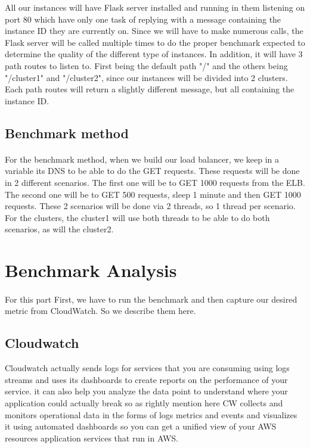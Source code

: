 \documentclass[12pt]{article}
\begin{document}
		All our instances will have Flask server installed and running in them listening on port 80 which have only one task of replying
		with a message containing the instance ID they are currently on. Since we will have to make numerous calls, the Flask server 
		will be called multiple times to do the proper benchmark expected to determine the quality of the different type of instances. In addition, it will have 3 path routes to listen to. First being the default path "/" and the others being "/cluster1" and "/cluster2", since our instances will be divided into 2 clusters. Each path routes will return a slightly different message, but all containing the instance ID.
		\bigskip

	\subsection{Benchmark method}
		\paragraph{} For the benchmark method, when we build our load balancer, we keep in a variable its DNS to be able to do the GET requests.
		These requests will be done in 2 different scenarios. The first one will be to GET 1000 requests from the ELB. The second one will be to 
		GET 500 requests, sleep 1 minute and then GET 1000 requests. These 2 scenarios will be done via 2 threads, so 1 thread per scenario. For 
		the clusters, the cluster1 will use both threads to be able to do both scenarios, as will the cluster2.
		\bigskip
		\pagebreak

\section{Benchmark Analysis} \label{sec:benchmark}
	\paragraph{} For  this part First, we have to run the benchmark and then capture our desired metric from CloudWatch. So we describe them here.
        \subsection{Cloudwatch}
        Cloudwatch actually sends logs for services that you are consuming using logs streams and uses its dashboards to create reports on the performance of your service. it can also help you analyze the data point to understand where your application could actually break so as rightly mention here CW collects and monitors operational data in the forms of logs metrics and events and visualizes it using automated dashboards  so you can get a unified view of your AWS resources application services that run in AWS.
\end{document}
